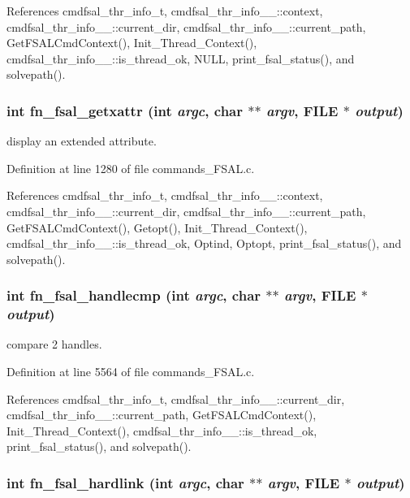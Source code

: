 References cmdfsal\_\-thr\_\-info\_\-t, cmdfsal\_\-thr\_\-info\_\-\_\-::context, cmdfsal\_\-thr\_\-info\_\-\_\-::current\_\-dir, cmdfsal\_\-thr\_\-info\_\-\_\-::current\_\-path, Get\-FSALCmd\-Context(), Init\_\-Thread\_\-Context(), cmdfsal\_\-thr\_\-info\_\-\_\-::is\_\-thread\_\-ok, NULL, print\_\-fsal\_\-status(), and solvepath().
\subsubsection{\setlength{\rightskip}{0pt plus 5cm}int fn\_\-fsal\_\-getxattr (int {\em argc}, char $\ast$$\ast$ {\em argv}, FILE $\ast$ {\em output})}\label{commands__FSAL_8c_a23}


display an extended attribute. 

Definition at line 1280 of file commands\_\-FSAL.c.

References cmdfsal\_\-thr\_\-info\_\-t, cmdfsal\_\-thr\_\-info\_\-\_\-::context, cmdfsal\_\-thr\_\-info\_\-\_\-::current\_\-dir, cmdfsal\_\-thr\_\-info\_\-\_\-::current\_\-path, Get\-FSALCmd\-Context(), Getopt(), Init\_\-Thread\_\-Context(), cmdfsal\_\-thr\_\-info\_\-\_\-::is\_\-thread\_\-ok, Optind, Optopt, print\_\-fsal\_\-status(), and solvepath().
\subsubsection{\setlength{\rightskip}{0pt plus 5cm}int fn\_\-fsal\_\-handlecmp (int {\em argc}, char $\ast$$\ast$ {\em argv}, FILE $\ast$ {\em output})}\label{commands__FSAL_8c_a46}


compare 2 handles. 

Definition at line 5564 of file commands\_\-FSAL.c.

References cmdfsal\_\-thr\_\-info\_\-t, cmdfsal\_\-thr\_\-info\_\-\_\-::current\_\-dir, cmdfsal\_\-thr\_\-info\_\-\_\-::current\_\-path, Get\-FSALCmd\-Context(), Init\_\-Thread\_\-Context(), cmdfsal\_\-thr\_\-info\_\-\_\-::is\_\-thread\_\-ok, print\_\-fsal\_\-status(), and solvepath().
\subsubsection{\setlength{\rightskip}{0pt plus 5cm}int fn\_\-fsal\_\-hardlink (int {\em argc}, char $\ast$$\ast$ {\em argv}, FILE $\ast$ {\em output})}\label{commands__FSAL_8c_a31}



